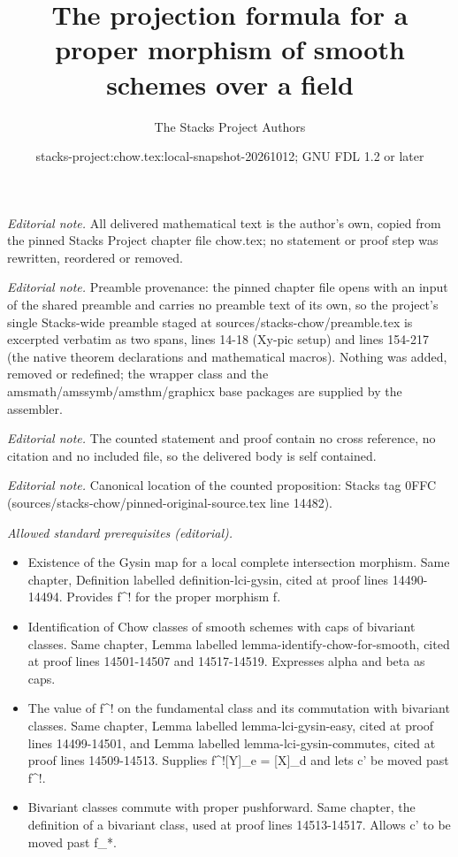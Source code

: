 \documentclass[10pt,a4paper]{amsart}
\title{The projection formula for a proper morphism of smooth schemes over a field}
\author{The Stacks Project Authors}
\date{stacks-project:chow.tex:local-snapshot-20261012; GNU FDL 1.2 or later}
\theoremstyle{plain}
\theoremstyle{definition}
\theoremstyle{remark}
\numberwithin{equation}{subsection}
\begin{document}
\maketitle
\noindent\textit{Editorial note.} All delivered mathematical text is the author's own, copied from the pinned Stacks Project chapter file chow.tex; no statement or proof step was rewritten, reordered or removed.\par\medskip
\noindent\textit{Editorial note.} Preamble provenance: the pinned chapter file opens with an input of the shared preamble and carries no preamble text of its own, so the project's single Stacks-wide preamble staged at sources/stacks-chow/preamble.tex is excerpted verbatim as two spans, lines 14-18 (Xy-pic setup) and lines 154-217 (the native theorem declarations and mathematical macros). Nothing was added, removed or redefined; the wrapper class and the amsmath/amssymb/amsthm/graphicx base packages are supplied by the assembler.\par\medskip
\noindent\textit{Editorial note.} The counted statement and proof contain no cross reference, no citation and no included file, so the delivered body is self contained.\par\medskip
\noindent\textit{Editorial note.} Canonical location of the counted proposition: Stacks tag 0FFC (sources/stacks-chow/pinned-original-source.tex line 14482).\par\medskip
\noindent\textit{Allowed standard prerequisites (editorial).}\begin{itemize}
\item Existence of the Gysin map for a local complete intersection morphism. Same chapter, Definition labelled definition-lci-gysin, cited at proof lines 14490-14494. Provides f\textasciicircum{}! for the proper morphism f.
\item Identification of Chow classes of smooth schemes with caps of bivariant classes. Same chapter, Lemma labelled lemma-identify-chow-for-smooth, cited at proof lines 14501-14507 and 14517-14519. Expresses alpha and beta as caps.
\item The value of f\textasciicircum{}! on the fundamental class and its commutation with bivariant classes. Same chapter, Lemma labelled lemma-lci-gysin-easy, cited at proof lines 14499-14501, and Lemma labelled lemma-lci-gysin-commutes, cited at proof lines 14509-14513. Supplies f\textasciicircum{}![Y]\_e = [X]\_d and lets c' be moved past f\textasciicircum{}!.
\item Bivariant classes commute with proper pushforward. Same chapter, the definition of a bivariant class, used at proof lines 14513-14517. Allows c' to be moved past f\_*.
\end{itemize}\medskip
\end{document}
